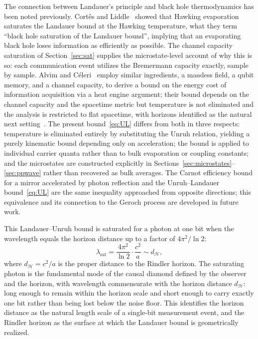 \documentclass[12pt,a4paper]{article}
\begin{document}
The connection between Landauer's principle and black hole 
thermodynamics has been noted previously. 
Cort\^{e}s and Liddle~\cite{cortes2024hawking} showed that 
Hawking evaporation saturates the Landauer bound at the Hawking 
temperature,  what they term ``black hole saturation of the 
Landauer bound'',  implying that an evaporating black hole 
loses information as efficiently as possible. The channel 
capacity saturation of Section~\ref{sec:sat} supplies the 
microstate-level account of why this is so: each communication 
event utilizes the Bremermann capacity exactly, sample by sample.
Alvim and C\'{e}leri~\cite{alvim2024landauer} employ similar 
ingredients,  a massless field, a qubit memory, and a channel 
capacity,  to derive a bound on the energy cost of information 
acquisition via a heat engine argument; their bound depends on 
the channel capacity and the spacetime metric but temperature 
is not eliminated and the analysis is restricted to flat 
spacetime, with horizons identified as the natural next 
setting~\cite{alvim2024landauer}.
The present bound~\eqref{eq:UL} differs from both in three 
respects: temperature is eliminated entirely by substituting 
the Unruh relation, yielding a purely kinematic bound depending 
only on acceleration; the bound is applied to individual carrier 
quanta rather than to bulk evaporation or coupling constants; 
and the microstates are constructed explicitly in 
Sections~\ref{sec:microstates}--\ref{sec:ppwave} rather than 
recovered as bulk averages. The Carnot efficiency bound for a 
mirror accelerated by photon reflection and the 
Unruh--Landauer bound~\eqref{eq:UL} are the same inequality 
approached from opposite directions; this equivalence and its 
connection to the Geroch process are developed in future work.


This Landauer--Unruh bound is saturated for a photon at one bit
when the wavelength equals the horizon distance up to a factor 
of $4\pi^2/\ln 2$:
\begin{equation}
\lambda_{\text{sat}} = \frac{4\pi^2}{\ln 2}\cdot\frac{c^2}{a} \sim d_{\mathcal{H}},
\end{equation}
where $d_{\mathcal{H}} = c^2/a$ is the proper distance to the 
Rindler horizon.
The saturating photon is the fundamental mode of the causal 
diamond defined by the observer and the horizon, with wavelength 
commensurate with the horizon distance $d_\mathcal{H}$: long 
enough to remain within the horizon scale and short enough to 
carry exactly one bit rather than being lost below the noise floor.
This identifies the horizon distance as the natural 
length scale of a single-bit measurement event, and 
the Rindler horizon as the surface at which the Landauer 
bound is geometrically realized.
\end{document}
